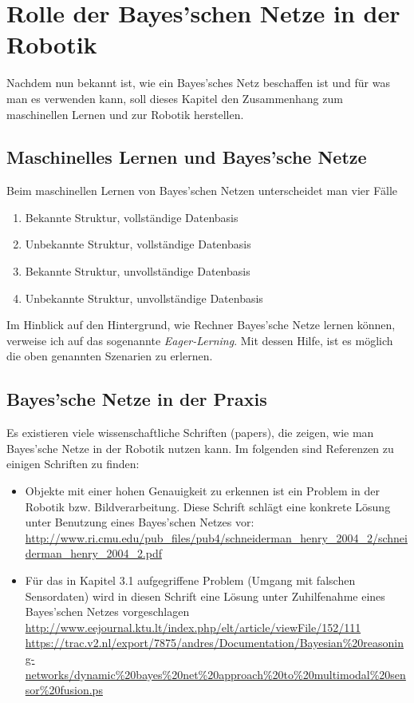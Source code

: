 \chapter{Rolle der Bayes'schen Netze in der Robotik}
Nachdem nun bekannt ist, wie ein Bayes'sches Netz beschaffen ist und für was man es verwenden kann, soll dieses Kapitel den Zusammenhang zum maschinellen Lernen und zur Robotik herstellen.
\section{Maschinelles Lernen und Bayes'sche Netze}
Beim maschinellen Lernen von Bayes'schen Netzen unterscheidet man vier Fälle \cite{Friedman}
\begin{enumerate}

\item Bekannte Struktur, vollständige Datenbasis
\item Unbekannte Struktur, vollständige Datenbasis
\item Bekannte Struktur, unvollständige Datenbasis 
\item Unbekannte Struktur, unvollständige Datenbasis
\end{enumerate}

Im Hinblick auf den Hintergrund, wie Rechner Bayes'sche Netze lernen können, verweise ich auf das sogenannte \textit{Eager-Lerning}. Mit dessen Hilfe, ist es möglich die oben genannten Szenarien zu erlernen. 

\section{Bayes'sche Netze in der Praxis}
Es existieren viele wissenschaftliche Schriften (papers), die zeigen, wie man Bayes'sche Netze in der Robotik nutzen kann. Im folgenden sind Referenzen zu einigen Schriften zu finden:
\begin{itemize}
\item Objekte mit einer hohen Genauigkeit zu erkennen ist ein Problem in der Robotik bzw. Bildverarbeitung. Diese Schrift schlägt eine konkrete Lösung unter Benutzung eines Bayes'schen Netzes vor: \url{http://www.ri.cmu.edu/pub_files/pub4/schneiderman_henry_2004_2/schneiderman_henry_2004_2.pdf}
\item Für das in Kapitel 3.1 aufgegriffene Problem (Umgang mit falschen Sensordaten) wird in diesen Schrift eine Lösung unter Zuhilfenahme eines Bayes'schen Netzes vorgeschlagen \subitem \url{http://www.eejournal.ktu.lt/index.php/elt/article/viewFile/152/111} 
\subitem \url{https://trac.v2.nl/export/7875/andres/Documentation/Bayesian%20reasoning-networks/dynamic%20bayes%20net%20approach%20to%20multimodal%20sensor%20fusion.ps}
\end{itemize}






